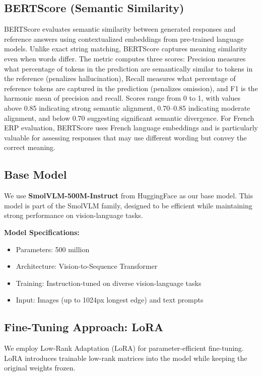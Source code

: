 \documentclass[10pt,conference,compsocconf]{IEEEtran}
\begin{document}
\subsection*{BERTScore (Semantic Similarity)}
BERTScore evaluates semantic similarity between generated responses and reference answers using contextualized embeddings from pre-trained language models. Unlike exact string matching, BERTScore captures meaning similarity even when words differ. The metric computes three scores: Precision measures what percentage of tokens in the prediction are semantically similar to tokens in the reference (penalizes hallucination), Recall measures what percentage of reference tokens are captured in the prediction (penalizes omission), and F1 is the harmonic mean of precision and recall. Scores range from 0 to 1, with values above 0.85 indicating strong semantic alignment, 0.70--0.85 indicating moderate alignment, and below 0.70 suggesting significant semantic divergence. For French ERP evaluation, BERTScore uses French language embeddings and is particularly valuable for assessing responses that may use different wording but convey the correct meaning.




\subsection{Base Model}

We use \textbf{SmolVLM-500M-Instruct} from HuggingFace as our base model. This model is part of the SmolVLM family, designed to be efficient while maintaining strong performance on vision-language tasks.

\textbf{Model Specifications:}
\begin{itemize}
    \item Parameters: 500 million
    \item Architecture: Vision-to-Sequence Transformer
    \item Training: Instruction-tuned on diverse vision-language tasks
    \item Input: Images (up to 1024px longest edge) and text prompts
\end{itemize}

\subsection{Fine-Tuning Approach: LoRA}

We employ Low-Rank Adaptation (LoRA) for parameter-efficient fine-tuning. LoRA introduces trainable low-rank matrices into the model while keeping the original weights frozen.
\end{document}
